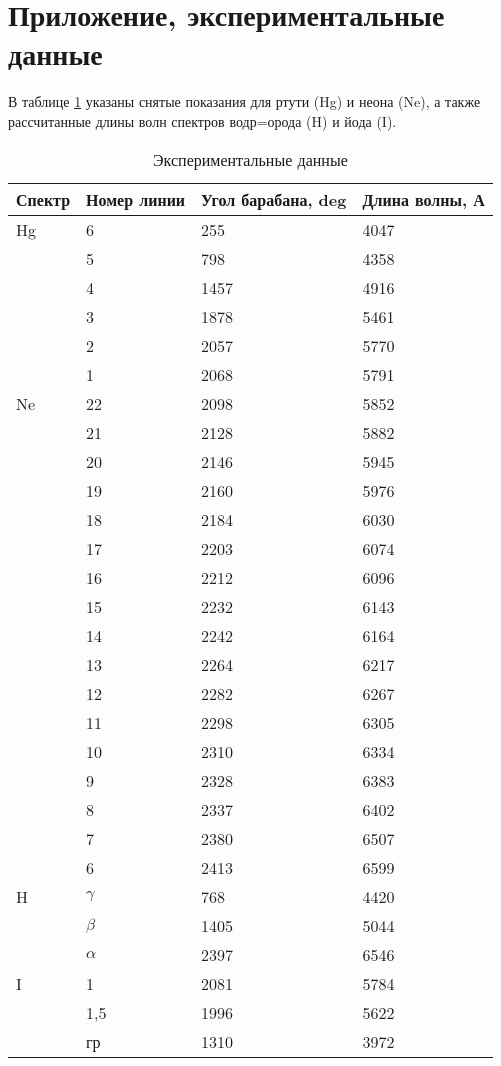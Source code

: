 \section{Приложение, экспериментальные данные}

В таблице \ref{app} указаны снятые показания для ртути (Hg) и неона (Ne), а также рассчитанные длины волн спектров водр=орода (H) и йода (I).

\begin{table}[!ht]\label{app}
    \centering
    \begin{tabular}{|l|l|l|l|}
    \hline
        Спектр & Номер линии & Угол барабана, deg & Длина волны, А \\ \hline
        Hg & 6 & 255 & 4047 \\ \hline
        ~ & 5 & 798 & 4358 \\ \hline
        ~ & 4 & 1457 & 4916 \\ \hline
        ~ & 3 & 1878 & 5461 \\ \hline
        ~ & 2 & 2057 & 5770 \\ \hline
        ~ & 1 & 2068 & 5791 \\ \hline
        Ne & 22 & 2098 & 5852 \\ \hline
        ~ & 21 & 2128 & 5882 \\ \hline
        ~ & 20 & 2146 & 5945 \\ \hline
        ~ & 19 & 2160 & 5976 \\ \hline
        ~ & 18 & 2184 & 6030 \\ \hline
        ~ & 17 & 2203 & 6074 \\ \hline
        ~ & 16 & 2212 & 6096 \\ \hline
        ~ & 15 & 2232 & 6143 \\ \hline
        ~ & 14 & 2242 & 6164 \\ \hline
        ~ & 13 & 2264 & 6217 \\ \hline
        ~ & 12 & 2282 & 6267 \\ \hline
        ~ & 11 & 2298 & 6305 \\ \hline
        ~ & 10 & 2310 & 6334 \\ \hline
        ~ & 9 & 2328 & 6383 \\ \hline
        ~ & 8 & 2337 & 6402 \\ \hline
        ~ & 7 & 2380 & 6507 \\ \hline
        ~ & 6 & 2413 & 6599 \\ \hline
        H & $\gamma$ & 768 & 4420 \\ \hline
        ~ & $\beta$ & 1405 & 5044 \\ \hline
        ~ & $\alpha$ & 2397 & 6546 \\ \hline
        I & 1 & 2081 & 5784 \\ \hline
        ~ & 1,5 & 1996 & 5622 \\ \hline
        ~ & гр & 1310 & 3972 \\ \hline
    \end{tabular}
    \caption{Экспериментальные данные}
\end{table}